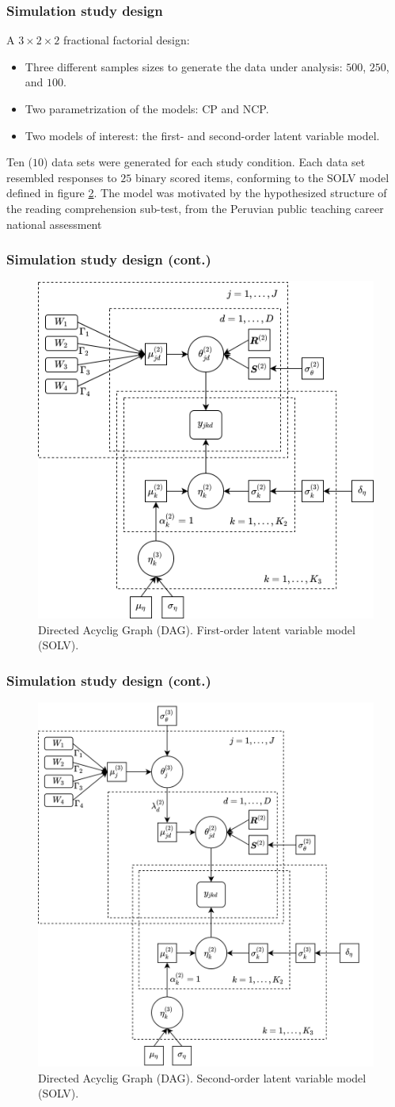 \documentclass[arial,12pt,xcolor=dvipsnames]{beamer}
\begin{document}
%
\begin{frame}
	\frametitle{Simulation study design}
	A $3 \times 2 \times 2$ fractional factorial design:
	\begin{itemize}
		\item Three different samples sizes to generate the data under analysis: $500$, $250$, and $100$.
		\item Two parametrization of the models: CP and NCP.
		\item Two models of interest: the first- and second-order latent variable model.
	\end{itemize}
	Ten ($10$) data sets were generated for each study condition. Each data set resembled responses to $25$ binary scored items, conforming to the SOLV model defined in figure \ref{fig:SOLV_model}. The model was motivated by the hypothesized structure of the reading comprehension sub-test, from the Peruvian public teaching career national assessment
\end{frame}
%
\begin{frame}
	\frametitle{Simulation study design (cont.)}
	\begin{figure}[h]
		\centering
		\includegraphics[width=0.5\linewidth]{4_FOLV_dag}
		\caption{Directed Acyclig Graph (DAG). First-order latent variable model (SOLV).}
		\label{fig:FOLV_model}
	\end{figure}
\end{frame}
%
\begin{frame}
	\frametitle{Simulation study design (cont.)}
	\begin{figure}[h]
		\centering
		\includegraphics[width=0.50\linewidth]{4_SOLV_dag}
		\caption{Directed Acyclig Graph (DAG). Second-order latent variable model (SOLV).}
		\label{fig:SOLV_model}
	\end{figure}
\end{frame}
\end{document}
